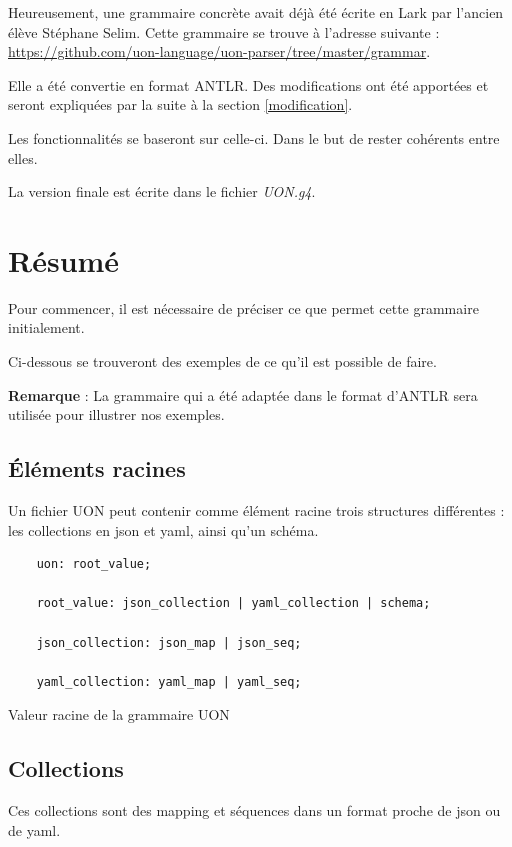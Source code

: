 \documentclass[
    iict, %
    il, %
]{heig-tb}
\begin{document}
Heureusement, une grammaire concrète avait déjà été écrite en Lark par l'ancien élève Stéphane Selim.
Cette grammaire se trouve à l'adresse suivante : \url{https://github.com/uon-language/uon-parser/tree/master/grammar}.

Elle a été convertie en format ANTLR. Des modifications ont été apportées et seront expliquées par la suite à la section \ref{modification}.

Les fonctionnalités se baseront sur celle-ci. Dans le but de rester cohérents entre elles.

La version finale est écrite dans le fichier \emph{UON.g4}.

\section{Résumé}
Pour commencer, il est nécessaire de préciser ce que permet cette grammaire initialement.

Ci-dessous se trouveront des exemples de ce qu'il est possible de faire.

\textbf{Remarque} : La grammaire qui a été adaptée dans le format d'ANTLR sera utilisée pour illustrer nos exemples.

\subsection{Éléments racines}

Un fichier UON peut contenir comme élément racine trois structures différentes : les collections en json et yaml, ainsi qu'un schéma.

\begin{listing}[!ht]
    \begin{verbatim}
    uon: root_value;

    root_value: json_collection | yaml_collection | schema;

    json_collection: json_map | json_seq;

    yaml_collection: yaml_map | yaml_seq;
    \end{verbatim}
    \caption{Valeur racine de la grammaire UON}
    \label{uon-root-value}
\end{listing}

\subsection{Collections}
Ces collections sont des mapping et séquences dans un format proche de json ou de yaml.
\end{document}
